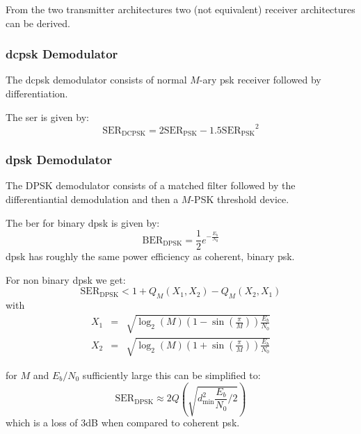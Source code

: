 From the two transmitter architectures two (not equivalent) receiver architectures can
be derived.

\subsubsection{\acl{dcpsk} Demodulator}
The \ac{dcpsk} demodulator consists of normal $M$-ary \ac{psk} receiver followed by
differentiation.

The \ac{ser} is given by:
\begin{equation}
    \text{SER}_\text{DCPSK} = 2 \text{SER}_\text{PSK} - 1.5 {\text{SER}_\text{PSK}}^2
\end{equation}

\subsubsection{\acl{dpsk} Demodulator}
The DPSK demodulator consists of a matched filter followed by the differentiantial
demodulation and then a $M$-PSK threshold device.

The \ac{ber} for binary \ac{dpsk} is given by:
\begin{equation}
    \text{BER}_\text{DPSK} = \frac{1}{2} e^{-\frac{E_b}{N_0}}
\end{equation}
\ac{dpsk} has roughly the same power efficiency as coherent, binary \ac{psk}.

For non binary \ac{dpsk} we get:
\begin{equation}
    \text{SER}_\text{DPSK} < 1 + Q_M(X_1, X_2) - Q_M(X_2, X_1)
\end{equation}
with
\begin{eqnarray}
    X_1 &=& \sqrt{\log_2(M)\left(1-\sin\left(\frac{\pi}{M}\right)\right)\frac{E_b}{N_0}} \\
    X_2 &=& \sqrt{\log_2(M)\left(1+\sin\left(\frac{\pi}{M}\right)\right)\frac{E_b}{N_0}} 
\end{eqnarray}

for $M$ and $E_b/N_0$ sufficiently large this can be simplified to:
\begin{equation}
    \text{SER}_\text{DPSK} \approx 2 Q\left(\sqrt{d_\text{min}^2 \frac{E_b}{N_0} / 2}\right)
\end{equation}
which is a loss of 3dB when compared to coherent \ac{psk}.
